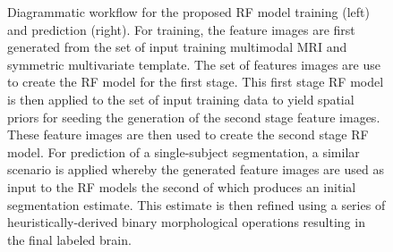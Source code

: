 \documentclass[preprint,authoryear,review,12pt]{elsarticle}
\begin{document}
\begin{figure}
  \centering
   \vspace{-15mm}
  \caption{Diagrammatic workflow for the proposed RF model training (left) and prediction
  (right).  For training, the feature images are first generated from the set of input 
  training multimodal MRI and symmetric multivariate template. The set of features images are 
  use to create the RF model for the first stage.  This first stage RF model is then applied
  to the set of input training data to yield spatial priors for seeding the generation of the
  second stage feature images.  These feature images are then used to create the second
  stage RF model.  For prediction of a single-subject segmentation, a similar scenario 
  is applied whereby the generated feature images are used as input to the RF models the
  second of which produces an initial segmentation estimate.  This estimate is then refined
  using a series of heuristically-derived binary morphological operations resulting in the 
  final labeled brain.
  }
  \label{fig:pipeline}
\end{figure}
\end{document}
